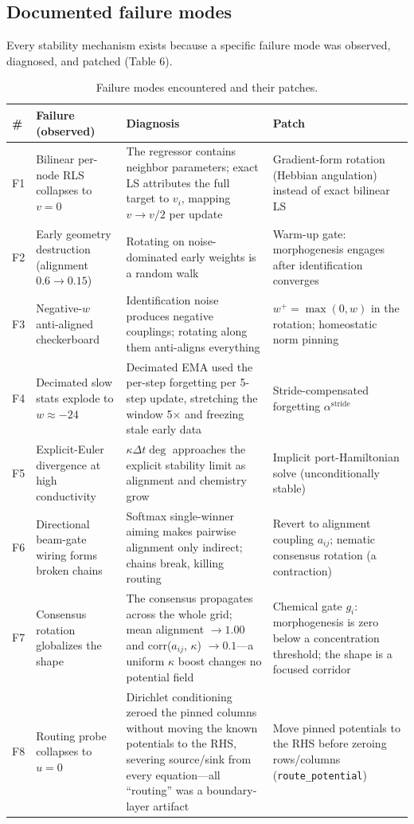 \documentclass[11pt]{article}
\begin{document}
\subsection{Documented failure modes}
\label{sec:fail}
Every stability mechanism exists because a specific failure mode was observed,
diagnosed, and patched (Table 6).

\begin{table}[h]
\centering\footnotesize
\setlength{\tabcolsep}{3pt}
\caption{Failure modes encountered and their patches.}
\begin{tabular}{L{0.5cm}L{3.0cm}L{5.2cm}L{5.4cm}}
\toprule
\# & Failure (observed) & Diagnosis & Patch \\
\midrule
F1 & Bilinear per-node RLS collapses to $v = 0$ & The regressor contains neighbor parameters; exact LS attributes the full target to $v_i$, mapping $v \to v/2$ per update & Gradient-form rotation (Hebbian angulation) instead of exact bilinear LS \\
F2 & Early geometry destruction (alignment $0.6 \to 0.15$) & Rotating on noise-dominated early weights is a random walk & Warm-up gate: morphogenesis engages after identification converges \\
F3 & Negative-$w$ anti-aligned checkerboard & Identification noise produces negative couplings; rotating along them anti-aligns everything & $w^{+} = \max(0, w)$ in the rotation; homeostatic norm pinning \\
F4 & Decimated slow stats explode to $w \approx -24$ & Decimated EMA used the per-step forgetting per 5-step update, stretching the window 5$\times$ and freezing stale early data & Stride-compensated forgetting $\alpha^{\mathrm{stride}}$ \\
F5 & Explicit-Euler divergence at high conductivity & $\kappa \Delta t \deg$ approaches the explicit stability limit as alignment and chemistry grow & Implicit port-Hamiltonian solve (unconditionally stable) \\
F6 & Directional beam-gate wiring forms broken chains & Softmax single-winner aiming makes pairwise alignment only indirect; chains break, killing routing & Revert to alignment coupling $a_{ij}$; nematic consensus rotation (a contraction) \\
F7 & Consensus rotation globalizes the shape & The consensus propagates across the whole grid; mean alignment $\to 1.00$ and corr($a_{ij}$, $\kappa$) $\to 0.1$---a uniform $\kappa$ boost changes no potential field & Chemical gate $g_i$: morphogenesis is zero below a concentration threshold; the shape is a focused corridor \\
F8 & Routing probe collapses to $u = 0$ & Dirichlet conditioning zeroed the pinned columns without moving the known potentials to the RHS, severing source/sink from every equation---all ``routing'' was a boundary-layer artifact & Move pinned potentials to the RHS before zeroing rows/columns (\texttt{route\_potential}) \\
\bottomrule
\end{tabular}
\end{table}
\end{document}
